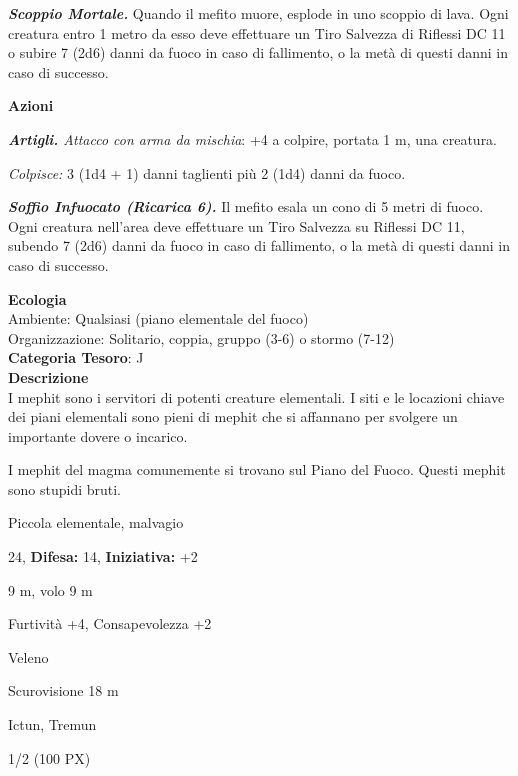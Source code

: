 \begin{multicols}{2}
{\emph{\textbf{Scoppio Mortale.}} Quando il mefito muore, esplode in uno scoppio di lava. Ogni creatura entro 1 metro da esso deve effettuare un Tiro Salvezza di Riflessi DC 11 o subire 7 (2d6) danni da fuoco in caso di fallimento, o la metà di questi danni in caso di successo.

\textbf{Azioni}

\emph{\textbf{Artigli.} Attacco con arma da mischia}: +4 a colpire, portata 1 m, una creatura.

\emph{Colpisce:} 3 (1d4 + 1) danni taglienti più 2 (1d4) danni da fuoco.

\emph{\textbf{Soffio Infuocato (Ricarica 6).}} Il mefito esala un cono di 5 metri di fuoco. Ogni creatura nell'area deve effettuare un Tiro Salvezza su Riflessi DC 11, subendo 7 (2d6) danni da fuoco in caso di fallimento, o la metà di questi danni in caso di successo.

\textbf{Ecologia}\\
Ambiente: Qualsiasi (piano elementale del fuoco)\\
Organizzazione: Solitario, coppia, gruppo (3-6) o stormo (7-12)\\
\textbf{Categoria Tesoro}: J\\
\textbf{Descrizione}\\
I mephit sono i servitori di potenti creature elementali. I siti e le locazioni chiave dei piani elementali sono pieni di mephit che si affannano per svolgere un importante dovere o incarico.

I mephit del magma comunemente si trovano sul Piano del Fuoco. Questi mephit sono stupidi bruti.

\noindent
\begin{description}[noitemsep, topsep=0pt, parsep=0pt, partopsep=0pt, leftmargin=0cm, labelwidth=2.2cm]
	\item[\textbf{Taglia/Tipo:}] Piccola elementale, malvagio
	\item[\textbf{Caratt.:}] 
	\item[\textbf{Punti Ferita:}] 24,  \textbf{Difesa:} 14,  \textbf{Iniziativa:} +2
	\item[\textbf{Movimento:}] 9 m, volo 9 m
	\item[\textbf{Tiri Salvez.:}] 
	\item[\textbf{Comp.:}] Furtività +4, Consapevolezza +2
	\item[\textbf{Imm. Danni:}] Veleno
	\item[\textbf{Sensi:}] Scurovisione 18 m
	\item[\textbf{Linguaggi:}] Ictun, Tremun
	\item[\textbf{Sfida:}] 1/2 (100 PX)\smallskip
\end{description}

}
\end{multicols}
